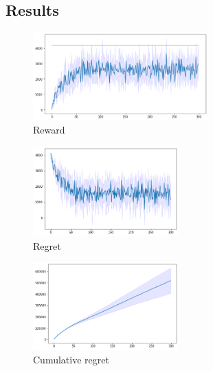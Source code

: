 \subsection{Results}
\begin{figure}[ht]
    \begin{center}
    \includegraphics[width=0.6\textwidth]{img/reward2.png}
    \caption{Reward}
    \label{fig:reward2}
    \end{center}
\end{figure}
\begin{multicols}{2}
    \begin{figure}[H]
        \begin{center}
        \includegraphics[width=0.5\textwidth]{img/regret2.png}
        \caption{Regret}
        \label{fig:regret2}
        \end{center}
    \end{figure}
    \columnbreak
    \begin{figure}[H]
        \begin{center}
        \includegraphics[width=0.5\textwidth]{img/cum_regret2.png}
        \caption{Cumulative regret}
        \label{fig:cum_reg2}
        \end{center}
    \end{figure}
\end{multicols}
